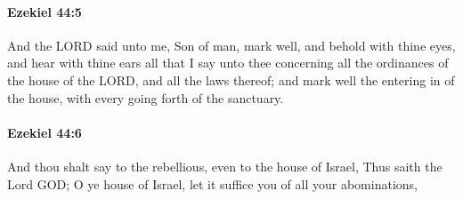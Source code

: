 		\paragraph{Ezekiel 44:5} %
			\label{EZEKIEL-44-5}

			And the LORD said unto me, Son of man, mark well, and behold with thine eyes, and hear with thine ears all that I say unto thee concerning all the ordinances of the house of the LORD, and all the laws thereof; and mark well the entering in of the house, with every going forth of the sanctuary.


		\paragraph{Ezekiel 44:6} %
			\label{EZEKIEL-44-6}

			And thou shalt say to the rebellious, even to the house of Israel, Thus saith the Lord GOD; O ye house of Israel, let it suffice you of all your abominations,

